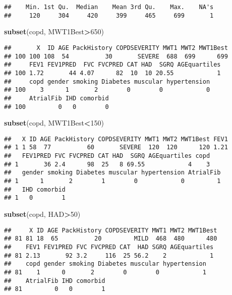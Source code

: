 \documentclass[
]{article}
\newenvironment{Shaded}{\begin{snugshade}}{\end{snugshade}}
\newcommand{\DecValTok}[1]{\textcolor[rgb]{0.00,0.00,0.81}{#1}}
\newcommand{\FunctionTok}[1]{\textcolor[rgb]{0.13,0.29,0.53}{\textbf{#1}}}
\newcommand{\NormalTok}[1]{#1}
\newcommand{\SpecialCharTok}[1]{\textcolor[rgb]{0.81,0.36,0.00}{\textbf{#1}}}
\begin{document}
\begin{verbatim}
##    Min. 1st Qu.  Median    Mean 3rd Qu.    Max.    NA's 
##     120     304     420     399     465     699       1
\end{verbatim}

\begin{Shaded}
\begin{Highlighting}[]
\FunctionTok{subset}\NormalTok{(copd, MWT1Best}\SpecialCharTok{\textgreater{}}\DecValTok{650}\NormalTok{)}
\end{Highlighting}
\end{Shaded}

\begin{verbatim}
##       X  ID AGE PackHistory COPDSEVERITY MWT1 MWT2 MWT1Best
## 100 100 108  54          30       SEVERE  688  699      699
##     FEV1 FEV1PRED  FVC FVCPRED CAT HAD  SGRQ AGEquartiles
## 100 1.72       44 4.07      82  10  10 20.55            1
##     copd gender smoking Diabetes muscular hypertension
## 100    3      1       2        0        0            0
##     AtrialFib IHD comorbid
## 100         0   0        0
\end{verbatim}

\begin{Shaded}
\begin{Highlighting}[]
\FunctionTok{subset}\NormalTok{(copd, MWT1Best}\SpecialCharTok{\textless{}}\DecValTok{150}\NormalTok{)}
\end{Highlighting}
\end{Shaded}

\begin{verbatim}
##   X ID AGE PackHistory COPDSEVERITY MWT1 MWT2 MWT1Best FEV1
## 1 1 58  77          60       SEVERE  120  120      120 1.21
##   FEV1PRED FVC FVCPRED CAT HAD  SGRQ AGEquartiles copd
## 1       36 2.4      98  25   8 69.55            4    3
##   gender smoking Diabetes muscular hypertension AtrialFib
## 1      1       2        1        0            0         1
##   IHD comorbid
## 1   0        1
\end{verbatim}

\begin{Shaded}
\begin{Highlighting}[]
\FunctionTok{subset}\NormalTok{(copd, HAD}\SpecialCharTok{\textgreater{}}\DecValTok{50}\NormalTok{)}
\end{Highlighting}
\end{Shaded}

\begin{verbatim}
##     X ID AGE PackHistory COPDSEVERITY MWT1 MWT2 MWT1Best
## 81 81 18  65          20         MILD  468  480      480
##    FEV1 FEV1PRED FVC FVCPRED CAT  HAD SGRQ AGEquartiles
## 81 2.13       92 3.2     116  25 56.2    2            1
##    copd gender smoking Diabetes muscular hypertension
## 81    1      0       2        0        0            1
##    AtrialFib IHD comorbid
## 81         0   0        1
\end{verbatim}
\end{document}
